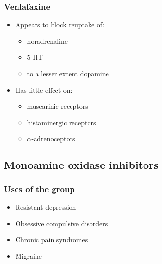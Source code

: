 \documentclass[11pt,a4paper]{article}
\begin{document}
\subsubsection{Venlafaxine}
\begin{itemize}
  \item Appears to block reuptake of:
  \begin{itemize}
    \item noradrenaline
    \item 5-HT
    \item to a lesser extent dopamine
  \end{itemize}
  \item Has little effect on:
  \begin{itemize}
    \item muscarinic receptors
    \item histaminergic receptors
    \item $\alpha$-adrenoceptors
  \end{itemize}
\end{itemize}

\subsection{Monoamine oxidase inhibitors}

\subsubsection{Uses of the group}
\begin{itemize}
  \item Resistant depression
  \item Obsessive compulsive disorders
  \item Chronic pain syndromes
  \item Migraine
\end{itemize}
\end{document}
